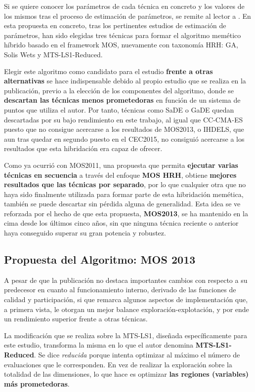 Si se quiere conocer los parámetros de cada técnica en concreto y los valores de los mismos tras el proceso de estimación de parámetros, se remite al lector a \cite{MOS2013}. En esta propuesta en concreto, tras los pertinentes estudios de estimación de parámetros, han sido elegidas tres técnicas para formar el algoritmo memético híbrido basado en el framework MOS, nuevamente con taxonomía HRH\cite{TaxonomyEAs}: GA, Solis Wets y MTS-LS1-Reduced. 

Elegir este algoritmo como candidato para el estudio \textbf{frente a otras alternativas} se hace indispensable debido al propio estudio que se realiza en la publicación, previo a la elección de los componentes del algoritmo, donde se \textbf{descartan las técnicas menos prometedoras} en función de un sistema de puntos que utiliza el autor. Por tanto, técnicas como SaDE o GaDE quedan descartadas por su bajo rendimiento en este trabajo, al igual que CC-CMA-ES puesto que no consigue acercarse a los resultados de MOS2013, o IHDELS, que aun tras quedar en segundo puesto en el CEC2015, no consiguió acercarse a los resultados que esta hibridación era capaz de ofrecer.

Como ya ocurrió con MOS2011, una propuesta que permita \textbf{ejecutar varias técnicas en secuencia} a través del enfoque \textbf{MOS HRH}, obtiene \textbf{mejores resultados que las técnicas por separado}, por lo que cualquier otra que no haya sido finalmente utilizada para formar parte de esta hibridación memética, también se puede descartar sin pérdida alguna de generalidad. Esta idea se ve reforzada por el hecho de que esta propuesta, \textbf{MOS2013}, se ha mantenido en la cima desde los últimos cinco años, sin que ninguna técnica reciente o anterior haya conseguido superar su gran potencia y robustez.

\subsection{Propuesta del Algoritmo: MOS 2013}

A pesar de que la publicación no destaca importantes cambios con respecto a su predecesor en cuanto al funcionamiento interno, derivado de las funciones de calidad y participación, si que remarca algunos aspectos de implementación que, a primera vista, le otorgan un mejor balance exploración-explotación, y por ende un rendimiento superior frente a otras técnicas.

La modificación que se realiza sobre la MTS-LS1, diseñada específicamente para este estudio, transforma la misma en lo que el autor denomina \textbf{MTS-LS1-Reduced}. Se dice \textit{reducida} porque intenta optimizar al máximo el número de evaluaciones que le corresponden. En vez de realizar la exploración sobre la totalidad de las dimensiones, lo que hace es optimizar \textbf{las regiones (variables) más prometedoras}. 

